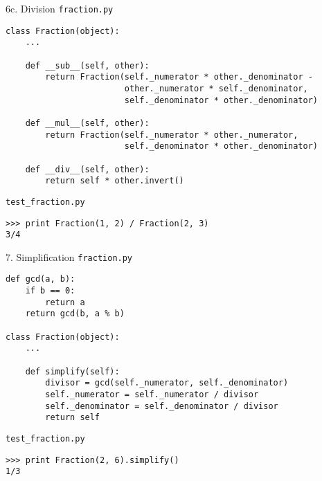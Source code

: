 \documentclass{beamer}
\begin{document}
\begin{frame}[fragile]{6c. Division}
\small
\texttt{fraction.py}
\begin{verbatim}
class Fraction(object):
    ...

    def __sub__(self, other):
        return Fraction(self._numerator * other._denominator -
                        other._numerator * self._denominator,
                        self._denominator * other._denominator)

    def __mul__(self, other):
        return Fraction(self._numerator * other._numerator,
                        self._denominator * other._denominator)

    def __div__(self, other):
        return self * other.invert()
\end{verbatim}

\vfill

\texttt{test\_fraction.py}
\begin{verbatim}
>>> print Fraction(1, 2) / Fraction(2, 3)
3/4
\end{verbatim}
\end{frame}

\begin{frame}[fragile]{7. Simplification}
\small
\texttt{fraction.py}
\begin{verbatim}
def gcd(a, b):
    if b == 0:
        return a
    return gcd(b, a % b)

class Fraction(object):
    ...

    def simplify(self):
        divisor = gcd(self._numerator, self._denominator)
        self._numerator = self._numerator / divisor
        self._denominator = self._denominator / divisor
        return self
\end{verbatim}

\vfill

\texttt{test\_fraction.py}
\begin{verbatim}
>>> print Fraction(2, 6).simplify()
1/3
\end{verbatim}
\end{frame}
\end{document}
